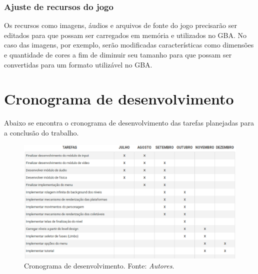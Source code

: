     \subsubsection{Ajuste de recursos do jogo}

      Os recursos como imagens, áudios e arquivos de fonte do jogo precisarão ser editados para que possam ser carregados em memória e utilizados no GBA. No caso das imagens, por exemplo, serão modificadas características como dimensões e quantidade de cores a fim de diminuir seu tamanho para que possam ser convertidas para um formato utilizável no GBA.

\section{Cronograma de desenvolvimento}

  Abaixo se encontra o cronograma de desenvolvimento das tarefas planejadas para a conclusão do trabalho.

  \begin{figure}[H]
    \centering \includegraphics[keepaspectratio=true,scale=0.8]{figuras/cronograma.eps}
    \caption[Cronograma de desenvolvimento]
      {Cronograma de desenvolvimento. Fonte: \textit{Autores}.}
    \label{cronograma}
  \end{figure}